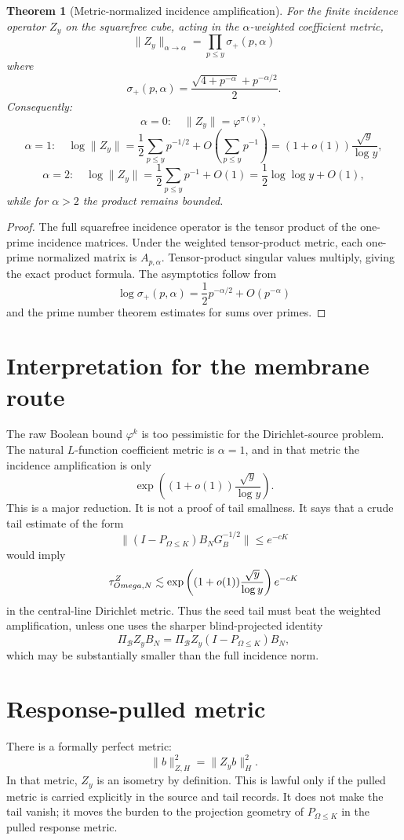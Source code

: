 \documentclass[11pt]{article}
\newtheorem{theorem}{Theorem}
\begin{document}
\begin{theorem}[Metric-normalized incidence amplification]
For the finite incidence operator $Z_y$ on the squarefree cube, acting in the $\alpha$-weighted coefficient metric,
\[
\boxed{
\|Z_y\|_{\alpha\to\alpha}
=
\prod_{p\le y}\sigma_+(p,\alpha)
}
\]
where
\[
\sigma_+(p,\alpha)=\frac{\sqrt{4+p^{-\alpha}}+p^{-\alpha/2}}{2}.
\]
Consequently:
\[
\alpha=0:
\quad
\|Z_y\|=\varphi^{\pi(y)},
\]
\[
\alpha=1:
\quad
\log\|Z_y\|
=\frac12\sum_{p\le y}p^{-1/2}+O\!\left(\sum_{p\le y}p^{-1}\right)
=(1+o(1))\frac{\sqrt y}{\log y},
\]
\[
\alpha=2:
\quad
\log\|Z_y\|
=\frac12\sum_{p\le y}p^{-1}+O(1)
=\frac12\log\log y+O(1),
\]
while for $\alpha>2$ the product remains bounded.
\end{theorem}

\begin{proof}
The full squarefree incidence operator is the tensor product of the one-prime incidence matrices.  Under the weighted tensor-product metric, each one-prime normalized matrix is $A_{p,\alpha}$.  Tensor-product singular values multiply, giving the exact product formula.  The asymptotics follow from
\[
\log\sigma_+(p,\alpha)
=\frac12p^{-\alpha/2}+O(p^{-\alpha})
\]
and the prime number theorem estimates for sums over primes.
\end{proof}

\section{Interpretation for the membrane route}
The raw Boolean bound $\varphi^k$ is too pessimistic for the Dirichlet-source problem.  The natural $L$-function coefficient metric is $\alpha=1$, and in that metric the incidence amplification is only
\[
\exp\left((1+o(1))\frac{\sqrt y}{\log y}\right).
\]
This is a major reduction.  It is not a proof of tail smallness.  It says that a crude tail estimate of the form
\[
\|(I-P_{\Omega\le K})B_NG_B^{-1/2}\|\le e^{-cK}
\]
would imply
\[
\tau_{\\Omega,N}^{Z}
\lesssim
\exp\left((1+o(1))\frac{\sqrt y}{\log y}\right)e^{-cK}
\]
in the central-line Dirichlet metric.  Thus the seed tail must beat the weighted amplification, unless one uses the sharper blind-projected identity
\[
\Pi_{\mathcal B}Z_yB_N
=
\Pi_{\mathcal B}Z_y(I-P_{\Omega\le K})B_N,
\]
which may be substantially smaller than the full incidence norm.

\section{Response-pulled metric}
There is a formally perfect metric:
\[
\|b\|_{Z,H}^{2}=\|Z_yb\|_{H}^{2}.
\]
In that metric, $Z_y$ is an isometry by definition.  This is lawful only if the pulled metric is carried explicitly in the source and tail records.  It does not make the tail vanish; it moves the burden to the projection geometry of $P_{\Omega\le K}$ in the pulled response metric.
\end{document}
